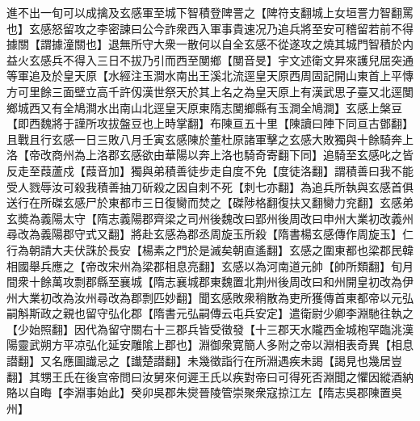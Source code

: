 進不出一旬可以成擒及玄感軍至城下智積登陴詈之【陴符支翻城上女垣詈力智翻罵也】玄感怒留攻之李密諫曰公今詐衆西入軍事貴速况乃追兵將至安可稽留若前不得據關【謂據潼關也】退無所守大衆一散何以自全玄感不從遂攻之燒其城門智積於内益火玄感兵不得入三日不拔乃引而西至閺鄉【閺音旻】宇文述衛文昇來護兒屈突通等軍追及於皇天原【水經注玉澗水南出王溪北流逕皇天原西周固記開山東首上平慱方可里餘三面壁立高千許仭漢世祭天於其上名之為皇天原上有漢武思子臺又北逕閺鄉城西又有全鳩澗水出南山北逕皇天原東隋志閺鄉縣有玉澗全鳩澗】玄感上槃豆【即西魏將于謹所攻拔盤豆也上時掌翻】布陳亘五十里【陳讀曰陣下同亘古鄧翻】且戰且行玄感一日三敗八月壬寅玄感陳於董杜原諸軍擊之玄感大敗獨與十餘騎奔上洛【帝改商州為上洛郡玄感欲由華陽以奔上洛也騎奇寄翻下同】追騎至玄感叱之皆反走至葭蘆戍【葭音加】獨與弟積善徒步走自度不免【度徒洛翻】謂積善曰我不能受人戮辱汝可殺我積善抽刀斫殺之因自刺不死【刺七亦翻】為追兵所執與玄感首俱送行在所磔玄感尸於東都市三日復臠而焚之【磔陟格翻復扶又翻臠力兖翻】玄感弟玄奬為義陽太守【隋志義陽郡齊梁之司州後魏改曰郢州後周改曰申州大業初改義州尋改為義陽郡守式又翻】將赴玄感為郡丞周旋玉所殺【隋書楊玄感傳作周旋玉】仁行為朝請大夫伏誅於長安【楊素之門於是滅矣朝直遙翻】玄感之圍東都也梁郡民韓相國舉兵應之【帝改宋州為梁郡相息亮翻】玄感以為河南道元帥【帥所類翻】旬月間衆十餘萬攻剽郡縣至襄城【隋志襄城郡東魏置北荆州後周改曰和州開皇初改為伊州大業初改為汝州尋改為郡剽匹妙翻】聞玄感敗衆稍散為吏所獲傳首東都帝以元弘嗣斛斯政之親也留守弘化郡【隋書元弘嗣傳云屯兵安定】遣衛尉少卿李淵馳往執之【少始照翻】因代為留守關右十三郡兵皆受徵發【十三郡天水隴西金城枹罕臨洮漢陽靈武朔方平凉弘化延安雕隂上郡也】淵御衆寛簡人多附之帝以淵相表奇異【相息譛翻】又名應圖䜟忌之【䜟楚譛翻】未幾徵詣行在所淵遇疾未謁【謁見也幾居豈翻】其甥王氏在後宫帝問曰汝舅來何遲王氏以疾對帝曰可得死否淵聞之懼因縱酒納賂以自晦【李淵事始此】癸卯吳郡朱爕晉陵管崇聚衆寇掠江左【隋志吳郡陳置吳州】

